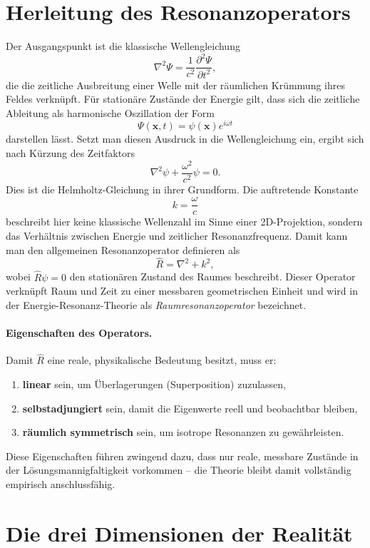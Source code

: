\section{Herleitung des Resonanzoperators}

Der Ausgangspunkt ist die klassische Wellengleichung
\[
\nabla^2 \Psi = \frac{1}{c^2} \frac{\partial^2 \Psi}{\partial t^2},
\]
die die zeitliche Ausbreitung einer Welle mit der räumlichen Krümmung ihres Feldes verknüpft.
Für stationäre Zustände der Energie gilt, dass sich die zeitliche Ableitung
als harmonische Oszillation der Form
\[
\Psi(\mathbf{x},t) = \psi(\mathbf{x}) e^{i\omega t}
\]
darstellen lässt.
Setzt man diesen Ausdruck in die Wellengleichung ein, ergibt sich nach Kürzung des Zeitfaktors
\[
\nabla^2 \psi + \frac{\omega^2}{c^2}\psi = 0.
\]
Dies ist die Helmholtz-Gleichung in ihrer Grundform.
Die auftretende Konstante
\[
k = \frac{\omega}{c}
\]
beschreibt hier keine klassische Wellenzahl im Sinne einer 2D-Projektion,
sondern das Verhältnis zwischen Energie und zeitlicher Resonanzfrequenz.
Damit kann man den allgemeinen Resonanzoperator definieren als
\[
\hat{R} = \nabla^2 + k^2,
\]
wobei $\hat{R}\psi = 0$ den stationären Zustand des Raumes beschreibt.
Dieser Operator verknüpft Raum und Zeit zu einer messbaren geometrischen Einheit
und wird in der Energie-Resonanz-Theorie als \emph{Raumresonanzoperator} bezeichnet.

\paragraph{Eigenschaften des Operators.}
Damit $\hat{R}$ eine reale, physikalische Bedeutung besitzt, muss er:
\begin{enumerate}
    \item \textbf{linear} sein, um Überlagerungen (Superposition) zuzulassen,
    \item \textbf{selbstadjungiert} sein, damit die Eigenwerte reell und beobachtbar bleiben,
    \item \textbf{räumlich symmetrisch} sein, um isotrope Resonanzen zu gewährleisten.
\end{enumerate}
Diese Eigenschaften führen zwingend dazu, dass nur reale, messbare Zustände
in der Lösungsmannigfaltigkeit vorkommen – die Theorie bleibt damit
vollständig empirisch anschlussfähig.

\section{Die drei Dimensionen der Realität}

